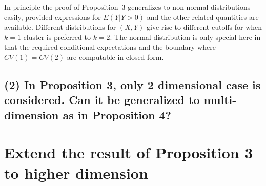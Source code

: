 \documentclass[11pt]{article}
\begin{document}
In principle the proof of Proposition~3 generalizes to non-normal
distributions easily, provided expressions for $E(Y | Y > 0)$ and the other
related quantities are available. Different distributions for $(X,Y)$ give
rise to different cutoffs for when $k = 1$ cluster is preferred to $k = 2$.
The normal distribution is only special here in that the required conditional
expectations and the boundary where $CV(1) = CV(2)$ are computable in closed
form. 


\subsection{(2) In Proposition 3, only 2 dimensional case is considered. Can
it be generalized to multi-dimension as in Proposition 4?}


\section{Extend the result of Proposition 3 to higher dimension}
\end{document}
